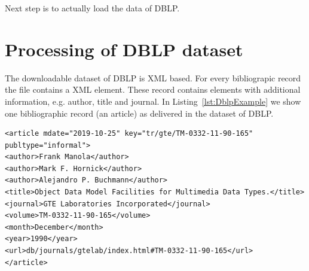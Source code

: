 \documentclass{ou-report}
\begin{document}
Next step is to actually load the data of DBLP.

\section{Processing of DBLP dataset}
The downloadable dataset of DBLP is XML based. For every bibliograpic record the
file contains a XML element. These record contains elements with additional information, e.g. 
author, title and journal. In Listing~\ref{lst:DblpExample} we show one 
bibliographic record (an article) as delivered in the dataset of DBLP.

\lstset{language=XML}
\begin{lstlisting}[caption={DBLP bibliografic record example},label={lst:DblpExample}]
<article mdate="2019-10-25" key="tr/gte/TM-0332-11-90-165" publtype="informal">
<author>Frank Manola</author>
<author>Mark F. Hornick</author>
<author>Alejandro P. Buchmann</author>
<title>Object Data Model Facilities for Multimedia Data Types.</title>
<journal>GTE Laboratories Incorporated</journal>
<volume>TM-0332-11-90-165</volume>
<month>December</month>
<year>1990</year>
<url>db/journals/gtelab/index.html#TM-0332-11-90-165</url>
</article>
\end{lstlisting}
\end{document}
